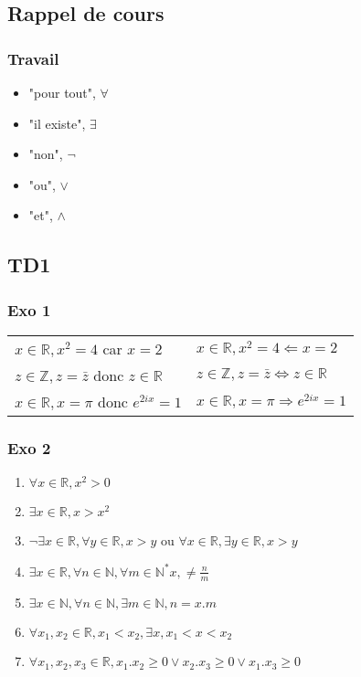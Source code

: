 \documentclass[]{book}
\theoremstyle{definition}
\newcommand{\bb}[1]{\mathbb{#1}}
\newcommand{\Z}{\bb{Z}}
\newcommand{\R}{\bb{R}}
\newcommand{\N}{\bb{N}}
\begin{document}
\subsection*{Rappel de cours}
\subsubsection*{Travail}

\begin{itemize}
\item "pour tout", $\forall$
\item "il existe", $\exists$
\item "non", $\lnot$
\item "ou", $\lor$
\item "et", $\land$
\end{itemize}


\subsection*{TD1}
\subsubsection*{Exo 1}

\begin{tabular}{l l }
$x \in \R, x^2 = 4$ car $x = 2$ & $x \in \R, x^2 = 4 \Leftarrow x = 2$ \\
$z \in \Z, z = \bar{z}$ donc $z \in \R$ & $z \in \Z, z = \bar{z} \Leftrightarrow z \in \R$ \\
$x \in \R, x = \pi$ donc $e^{2ix}= 1$ & $x \in \R, x = \pi \Rightarrow e^{2ix}= 1$ \\
\end{tabular}

\subsubsection*{Exo 2}
\begin{enumerate}
\item $\forall x \in \R, x^2 > 0$
\item $\exists x \in \R, x > x^2$
\item $\lnot \exists x \in \R, \forall y \in \R, x > y$ ou $\forall x \in \R, \exists y \in \R, x > y$
\item $\exists x \in \R, \forall n \in \N, \forall m \in \N^{*} x, \neq \frac{n}{m}$
\item $\exists x \in \N, \forall n \in \N, \exists m \in \N, n = x . m$
\item $\forall x_1, x_2 \in \R, x_1 < x_2, \exists x, x_1 < x < x_2$
\item $\forall x_1, x_2, x_3 \in \R, x_1.x_2 \geq 0 \lor x_2.x_3 \geq 0 \lor x_1.x_3 \geq 0$
\end{enumerate}
\end{document}
